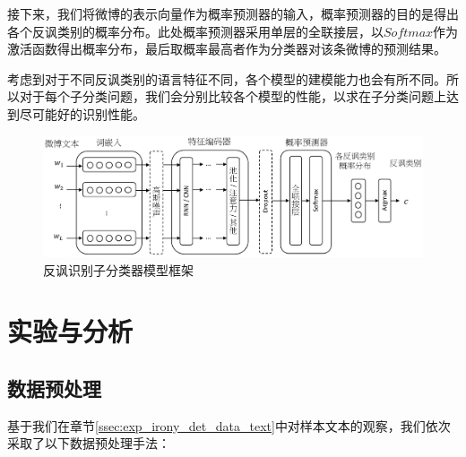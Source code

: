 接下来，我们将微博的表示向量作为概率预测器的输入，概率预测器的目的是得出各个反讽类别的概率分布。此处概率预测器采用单层的全联接层，以$Softmax$作为激活函数得出概率分布，最后取概率最高者作为分类器对该条微博的预测结果。

考虑到对于不同反讽类别的语言特征不同，各个模型的建模能力也会有所不同。所以对于每个子分类问题，我们会分别比较各个模型的性能，以求在子分类问题上达到尽可能好的识别性能。

\begin{figure}[H]
  \centering
  \includegraphics[width=\textwidth]{img/irony_det_cls_framework.pdf}
  \caption{反讽识别子分类器模型框架}
  \label{fig:irony_det_cls_framework}
\end{figure}

\section{实验与分析}
\label{sec:exp_irony_det_exp}

\subsection{数据预处理}

基于我们在章节\ref{ssec:exp_irony_det_data_text}中对样本文本的观察，我们依次采取了以下数据预处理手法：


